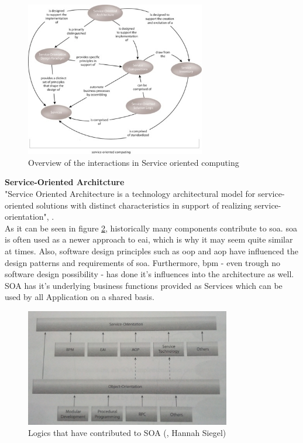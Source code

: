 \documentclass[12pt]{article}
\begin{document}
\begin{figure}
	\centering
	\includegraphics[width=0.7\textwidth]{images/serviceorientationdotcomwhatissoa}
	\caption{Overview of the interactions in Service oriented computing \cite{photos}}
	\label{fig:serviceorientedcomuting}
	\end{figure}
	\FloatBarrier\noindent
\textbf{Service-Oriented Architcture}\\
"Service Oriented Architecture is a technology architectural model for service-oriented solutions with distinct characteristics in support of realizing service-orientation", \cite[page 27]{grau}. \\
As it can be seen in figure \ref{fig:eaipartofso}, historically many components contribute to \gls{soa}. \gls{soa} is often used as a newer approach to \gls{eai}, which is why it may seem quite similar at times.  \cite{soaitwissen} Also, software design principles such as \gls{oop} and \gls{aop} have influenced the design patterns and requirements of \gls{soa}. Furthermore, \gls{bpm} - even trough no software design possibility - has done it's influences into the architecture as well. \\
SOA has it's underlying business functions provided as Services which can be used by all Application on a shared basis. 
\begin{figure}
	\centering
	\includegraphics[width=0.8\textwidth]{images/b1_25}
	\caption{Logics that have contributed to SOA (\cite[page 25]{grau}, Hannah Siegel)}
	\label{fig:eaipartofso}
	\end{figure}
\end{document}
